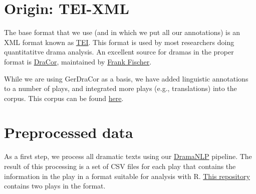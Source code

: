 \documentclass[]{book}
\begin{document}
\hypertarget{origin-tei-xml}{%
\section{Origin: TEI-XML}\label{origin-tei-xml}}

The base format that we use (and in which we put all our annotations) is an XML format known as \href{https://tei-c.org}{TEI}. This format is used by most researchers doing quantitatitve drama analysis. An excellent source for dramas in the proper format is \href{https://github.com/dracor-org/}{DraCor}, maintained by \href{https://www.hse.ru/en/org/persons/182492735}{Frank Fischer}.

While we are using GerDraCor as a basis, we have added linguistic annotations to a number of plays, and integrated more plays (e.g., translations) into the corpus. This corpus can be found \href{https://github.com/quadrama/Corpus}{here}.

\hypertarget{preprocessed-data}{%
\section{Preprocessed data}\label{preprocessed-data}}

As a first step, we process all dramatic texts using our \href{https://github.com/quadrama/DramaNLP}{DramaNLP} pipeline. The result of this processing is a set of CSV files for each play that contains the information in the play in a format suitable for analysis with R. \href{https://github.com/quadrama/data_test}{This repository} contains two plays in the format.
\end{document}
